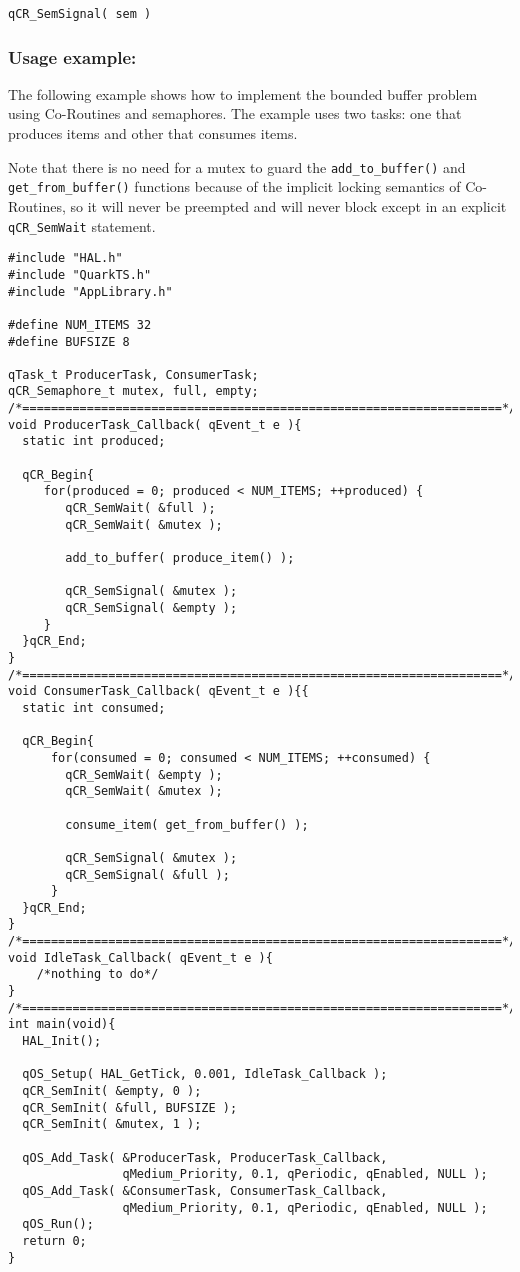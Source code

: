 \begin{lstlisting}[style=CStyle]
qCR_SemSignal( sem )
\end{lstlisting}


\subsubsection*{Usage example:}
The following example shows how to implement the bounded buffer problem using Co-Routines and semaphores. The example uses two tasks: one that produces items and other that consumes items.

Note that there is no need for a mutex to guard the \lstinline{add_to_buffer()} and \lstinline{get_from_buffer()} functions because of the implicit locking semantics of Co-Routines, so it will never be preempted and will never block except in an explicit \lstinline{qCR_SemWait} statement. \\

\begin{lstlisting}[style=CStyle]
#include "HAL.h"
#include "QuarkTS.h"
#include "AppLibrary.h"

#define NUM_ITEMS 32
#define BUFSIZE 8

qTask_t ProducerTask, ConsumerTask;
qCR_Semaphore_t mutex, full, empty;
/*===================================================================*/
void ProducerTask_Callback( qEvent_t e ){
  static int produced;
  
  qCR_Begin{
     for(produced = 0; produced < NUM_ITEMS; ++produced) {
        qCR_SemWait( &full );
        qCR_SemWait( &mutex );

        add_to_buffer( produce_item() );  
  
        qCR_SemSignal( &mutex );
        qCR_SemSignal( &empty );
     }
  }qCR_End;
}
/*===================================================================*/
void ConsumerTask_Callback( qEvent_t e ){{
  static int consumed;
  
  qCR_Begin{
      for(consumed = 0; consumed < NUM_ITEMS; ++consumed) {
        qCR_SemWait( &empty );
        qCR_SemWait( &mutex );    

        consume_item( get_from_buffer() );    

        qCR_SemSignal( &mutex ); 
        qCR_SemSignal( &full );
      }
  }qCR_End;
}
/*===================================================================*/
void IdleTask_Callback( qEvent_t e ){
    /*nothing to do*/
} 
/*===================================================================*/
int main(void){ 
  HAL_Init();

  qOS_Setup( HAL_GetTick, 0.001, IdleTask_Callback );
  qCR_SemInit( &empty, 0 );
  qCR_SemInit( &full, BUFSIZE );
  qCR_SemInit( &mutex, 1 );	
  
  qOS_Add_Task( &ProducerTask, ProducerTask_Callback,
                qMedium_Priority, 0.1, qPeriodic, qEnabled, NULL );
  qOS_Add_Task( &ConsumerTask, ConsumerTask_Callback,
                qMedium_Priority, 0.1, qPeriodic, qEnabled, NULL );
  qOS_Run(); 	
  return 0;
}
\end{lstlisting}

